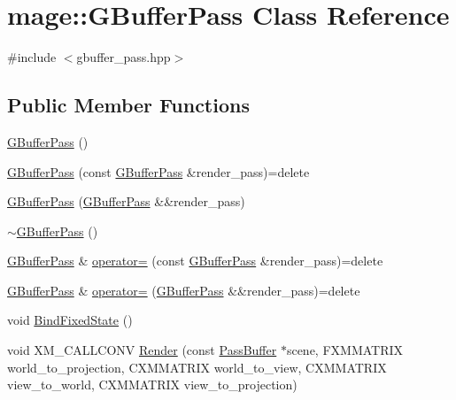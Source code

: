 \hypertarget{classmage_1_1_g_buffer_pass}{}\section{mage\+:\+:G\+Buffer\+Pass Class Reference}
\label{classmage_1_1_g_buffer_pass}


{\ttfamily \#include $<$gbuffer\+\_\+pass.\+hpp$>$}

\subsection*{Public Member Functions}
\begin{DoxyCompactItemize}
\item 
\hyperlink{classmage_1_1_g_buffer_pass_afe455d4051cddf84b7752b4bf4aa282f}{G\+Buffer\+Pass} ()
\item 
\hyperlink{classmage_1_1_g_buffer_pass_a3b9f59097aef9175f942c9c9424d0dab}{G\+Buffer\+Pass} (const \hyperlink{classmage_1_1_g_buffer_pass}{G\+Buffer\+Pass} \&render\+\_\+pass)=delete
\item 
\hyperlink{classmage_1_1_g_buffer_pass_a61a520a53c7a8029280eb1fc62d71ce6}{G\+Buffer\+Pass} (\hyperlink{classmage_1_1_g_buffer_pass}{G\+Buffer\+Pass} \&\&render\+\_\+pass)
\item 
\hyperlink{classmage_1_1_g_buffer_pass_a34b2735cfb9b3546c903760f42ff770c}{$\sim$\+G\+Buffer\+Pass} ()
\item 
\hyperlink{classmage_1_1_g_buffer_pass}{G\+Buffer\+Pass} \& \hyperlink{classmage_1_1_g_buffer_pass_a79468fb8b4547197315c0aabbabffa71}{operator=} (const \hyperlink{classmage_1_1_g_buffer_pass}{G\+Buffer\+Pass} \&render\+\_\+pass)=delete
\item 
\hyperlink{classmage_1_1_g_buffer_pass}{G\+Buffer\+Pass} \& \hyperlink{classmage_1_1_g_buffer_pass_ace14aafdd028f12296b3fabf1e36ca02}{operator=} (\hyperlink{classmage_1_1_g_buffer_pass}{G\+Buffer\+Pass} \&\&render\+\_\+pass)=delete
\item 
void \hyperlink{classmage_1_1_g_buffer_pass_a4a13364cc0318417f31df50d7081b0b0}{Bind\+Fixed\+State} ()
\item 
void X\+M\+\_\+\+C\+A\+L\+L\+C\+O\+NV \hyperlink{classmage_1_1_g_buffer_pass_af16b072db0c6511871e8342adc5c8bf0}{Render} (const \hyperlink{structmage_1_1_pass_buffer}{Pass\+Buffer} $\ast$scene, F\+X\+M\+M\+A\+T\+R\+IX world\+\_\+to\+\_\+projection, C\+X\+M\+M\+A\+T\+R\+IX world\+\_\+to\+\_\+view, C\+X\+M\+M\+A\+T\+R\+IX view\+\_\+to\+\_\+world, C\+X\+M\+M\+A\+T\+R\+IX view\+\_\+to\+\_\+projection)
\end{DoxyCompactItemize}
